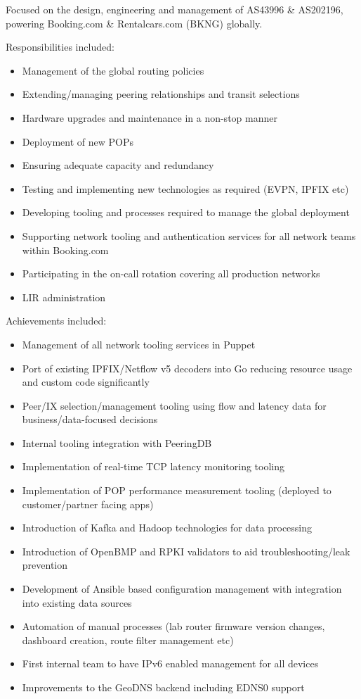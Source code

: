 Focused on the design, engineering and management of AS43996 \&
AS202196, powering Booking.com \& Rentalcars.com (BKNG) globally.

Responsibilities included:

\begin{itemize}
\tightlist
\item
  Management of the global routing policies
\item
  Extending/managing peering relationships and transit selections
\item
  Hardware upgrades and maintenance in a non-stop manner
\item
  Deployment of new POPs
\item
  Ensuring adequate capacity and redundancy
\item
  Testing and implementing new technologies as required (EVPN, IPFIX
  etc)
\item
  Developing tooling and processes required to manage the global
  deployment
\item
  Supporting network tooling and authentication services for all network
  teams within Booking.com
\item
  Participating in the on-call rotation covering all production networks
\item
  LIR administration
\end{itemize}

Achievements included:

\begin{itemize}
\tightlist
\item
  Management of all network tooling services in Puppet
\item
  Port of existing IPFIX/Netflow v5 decoders into Go reducing resource
  usage and custom code significantly
\item
  Peer/IX selection/management tooling using flow and latency data for
  business/data-focused decisions
\item
  Internal tooling integration with PeeringDB
\item
  Implementation of real-time TCP latency monitoring tooling
\item
  Implementation of POP performance measurement tooling (deployed to
  customer/partner facing apps)
\item
  Introduction of Kafka and Hadoop technologies for data processing
\item
  Introduction of OpenBMP and RPKI validators to aid
  troubleshooting/leak prevention
\item
  Development of Ansible based configuration management with integration
  into existing data sources
\item
  Automation of manual processes (lab router firmware version changes,
  dashboard creation, route filter management etc)
\item
  First internal team to have IPv6 enabled management for all devices
\item
  Improvements to the GeoDNS backend including EDNS0 support
\end{itemize}

